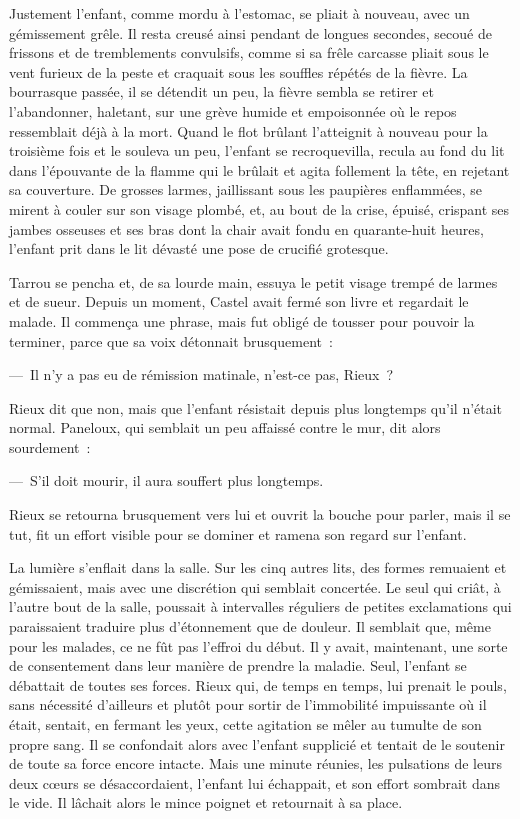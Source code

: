 \documentclass[french,twoside]{book} %
\begin{document}
Justement l’enfant, comme mordu à l’estomac, se pliait à nouveau, avec un gémissement grêle. Il resta creusé ainsi pendant de longues secondes, secoué de frissons et de tremblements convulsifs, comme si sa frêle carcasse pliait sous le vent furieux de la peste et craquait sous les souffles répétés de la fièvre. La bourrasque passée, il se détendit un peu, la fièvre sembla se retirer et l’abandonner, haletant, sur une grève humide et empoisonnée où le repos ressemblait déjà à la mort. Quand le flot brûlant l’atteignit à nouveau pour la troisième fois et le souleva un peu, l’enfant se recroquevilla, recula au fond du lit dans l’épouvante de la flamme qui le brûlait et agita follement la tête, en rejetant sa couverture. De grosses larmes, jaillissant sous les paupières enflammées, se mirent à couler sur son visage plombé, et, au bout de la crise, épuisé, crispant ses jambes osseuses et ses bras dont la chair avait fondu en quarante-huit heures, l’enfant prit dans le lit dévasté une pose de crucifié grotesque.\par
Tarrou se pencha et, de sa lourde main, essuya le petit visage trempé de larmes et de sueur. Depuis un moment, Castel avait fermé son livre et regardait le malade. Il commença une phrase, mais fut obligé de tousser pour pouvoir la terminer, parce que sa voix détonnait brusquement :\par
— Il n’y a pas eu de rémission matinale, n’est-ce pas, Rieux ?\par
Rieux dit que non, mais que l’enfant résistait depuis plus longtemps qu’il n’était normal. Paneloux, qui semblait un peu affaissé contre le mur, dit alors sourdement :\par
— S’il doit mourir, il aura souffert plus longtemps.\par
Rieux se retourna brusquement vers lui et ouvrit la bouche pour parler, mais il se tut, fit un effort visible pour se dominer et ramena son regard sur l’enfant.\par
La lumière s’enflait dans la salle. Sur les cinq autres lits, des formes remuaient et gémissaient, mais avec une discrétion qui semblait concertée. Le seul qui criât, à l’autre bout de la salle, poussait à intervalles réguliers de petites exclamations qui paraissaient traduire plus d’étonnement que de douleur. Il semblait que, même pour les malades, ce ne fût pas l’effroi du début. Il y avait, maintenant, une sorte de consentement dans leur manière de prendre la maladie. Seul, l’enfant se débattait de toutes ses forces. Rieux qui, de temps en temps, lui prenait le pouls, sans nécessité d’ailleurs et plutôt pour sortir de l’immobilité impuissante où il était, sentait, en fermant les yeux, cette agitation se mêler au tumulte de son propre sang. Il se confondait alors avec l’enfant supplicié et tentait de le soutenir de toute sa force encore intacte. Mais une minute réunies, les pulsations de leurs deux cœurs se désaccordaient, l’enfant lui échappait, et son effort sombrait dans le vide. Il lâchait alors le mince poignet et retournait à sa place.\par
\end{document}
